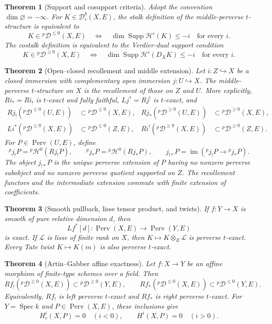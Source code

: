 \documentclass[10pt]{article}
\newtheorem{theorem}{Theorem}[section]
\theoremstyle{definition}
\newcommand{\Db}{\mathcal D}
\newcommand{\Dbc}{\mathcal D^b_c}
\newcommand{\Spec}{\operatorname{Spec}}
\newcommand{\Perv}{\operatorname{Perv}}
\begin{document}
\begin{theorem}[Support and cosupport criteria]
Adopt the convention \(\dim\varnothing=-\infty\).  For
\(K\in\Dbc(X,E)\), the stalk definition of the middle-perverse
\(t\)-structure is equivalent to
\[
 K\in{}^p\Db^{\le0}(X,E)
 \quad\Longleftrightarrow\quad
 \dim\operatorname{Supp}\mathcal H^i(K)\le-i
 \quad\text{for every }i.
\]
The costalk definition is equivalent to the Verdier-dual support condition
\[
 K\in{}^p\Db^{\ge0}(X,E)
 \quad\Longleftrightarrow\quad
 \dim\operatorname{Supp}\mathcal H^i(D_XK)\le-i
 \quad\text{for every }i.
\]
\end{theorem}

\begin{theorem}[Open--closed recollement and middle extension]
Let \(i:Z\hookrightarrow X\) be a closed immersion with complementary open
immersion \(j:U\hookrightarrow X\).  The middle-perverse \(t\)-structure on
\(X\) is the recollement of those on \(Z\) and \(U\).  More explicitly,
\(Ri_*=Ri_!\) is \(t\)-exact and fully faithful,
\(Lj^*=Rj^!\) is \(t\)-exact, and
\[
 \begin{aligned}
 Rj_!({}^p\Db^{\le0}(U,E))&\subset{}^p\Db^{\le0}(X,E),&
 Rj_*({}^p\Db^{\ge0}(U,E))&\subset{}^p\Db^{\ge0}(X,E),\\
 Li^*({}^p\Db^{\le0}(X,E))&\subset{}^p\Db^{\le0}(Z,E),&
 Ri^!({}^p\Db^{\ge0}(X,E))&\subset{}^p\Db^{\ge0}(Z,E).
 \end{aligned}
\]
For \(P\in\Perv(U,E)\), define
\[
 {}^pj_!P={}^p\mathcal H^0(Rj_!P),
 \qquad
 {}^pj_*P={}^p\mathcal H^0(Rj_*P),
 \qquad
 j_{!*}P=\operatorname{im}({}^pj_!P\to{}^pj_*P).
\]
The object \(j_{!*}P\) is the unique perverse extension of \(P\) having no
nonzero perverse subobject and no nonzero perverse quotient supported on
\(Z\).  The recollement functors and the intermediate extension commute
with finite extension of coefficients.
\end{theorem}

\begin{theorem}[Smooth pullback, lisse tensor product, and twists]
If \(f:Y\to X\) is smooth of pure relative dimension \(d\), then
\[
 Lf^*[d]:\Perv(X,E)\longrightarrow\Perv(Y,E)
\]
is exact.  If \(\mathcal L\) is lisse of finite rank on \(X\), then
\(K\mapsto K\otimes_E\mathcal L\) is perverse \(t\)-exact.  Every Tate
twist \(K\mapsto K(m)\) is also perverse \(t\)-exact.
\end{theorem}

\begin{theorem}[Artin--Gabber affine exactness]
Let \(f:X\to Y\) be an affine morphism of finite-type schemes over a field.
Then
\[
 Rf_!({}^p\Db^{\ge0}(X,E))\subset{}^p\Db^{\ge0}(Y,E),
 \qquad
 Rf_*({}^p\Db^{\le0}(X,E))\subset{}^p\Db^{\le0}(Y,E).
\]
Equivalently, \(Rf_!\) is left perverse \(t\)-exact and \(Rf_*\) is right
perverse \(t\)-exact.  For \(Y=\Spec k\) and \(P\in\Perv(X,E)\), these
inclusions give
\[
 H_c^i(X,P)=0\quad(i<0),
 \qquad
 H^i(X,P)=0\quad(i>0).
\]
\end{theorem}
\end{document}
